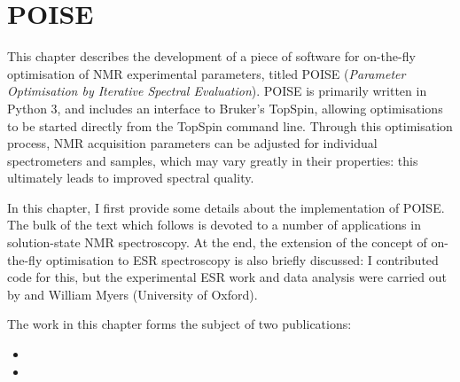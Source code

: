 \chapter{POISE}
\label{chpt:poise}

This chapter describes the development of a piece of software for on-the-fly optimisation of NMR experimental parameters, titled POISE (\textit{Parameter Optimisation by Iterative Spectral Evaluation}).
POISE is primarily written in Python 3, and includes an interface to Bruker's TopSpin, allowing optimisations to be started directly from the TopSpin command line.
Through this optimisation process, NMR acquisition parameters can be adjusted for individual spectrometers and samples, which may vary greatly in their properties: this ultimately leads to improved spectral quality.

In this chapter, I first provide some details about the implementation of POISE.
The bulk of the text which follows is devoted to a number of applications in solution-state NMR spectroscopy.
At the end, the extension of the concept of on-the-fly optimisation to ESR spectroscopy is also briefly discussed: I contributed code for this, but the experimental ESR work and data analysis were carried out by \JBV{} and William Myers (University of Oxford).

The work in this chapter forms the subject of two publications:

\begin{itemize}
    \item {}
    \item {}
\end{itemize}

\clearpage







\printbibliography[heading=subbibnumbered]{}
